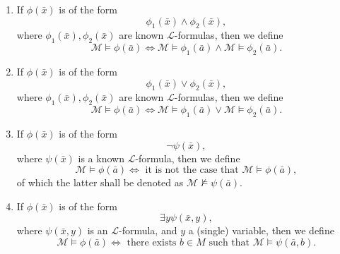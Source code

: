 \documentclass[notoc,notitlepage]{tufte-book}
\begin{document}
\begin{defn}
\begin{enumerate}
    \item If $\phi(\bar{x})$ is of the form
      \begin{equation*}
        \phi_1(\bar{x}) \land \phi_2(\bar{x}),
      \end{equation*}
      where $\phi_1(\bar{x}), \phi_2(\bar{x})$ are known $\mathcal{L}$-formulas, then we define
      \begin{equation*}
        \mathcal{M} \models \phi(\bar{a}) \iff \mathcal{M} \models \phi_1(\bar{a}) \land \mathcal{M} \models \phi_2(\bar{a}).
      \end{equation*}

    \item If $\phi(\bar{x})$ is of the form
      \begin{equation*}
        \phi_1(\bar{x}) \lor \phi_2(\bar{x}),
      \end{equation*}
      where $\phi_1(\bar{x}), \phi_2(\bar{x})$ are known $\mathcal{L}$-formulas, then we define
      \begin{equation*}
        \mathcal{M} \models \phi(\bar{a}) \iff \mathcal{M} \models \phi_1(\bar{a}) \lor \mathcal{M} \models \phi_2(\bar{a}).
      \end{equation*}

    \item If $\phi(\bar{x})$ is of the form
      \begin{equation*}
        \neg \psi(\bar{x}),
      \end{equation*}
      where $\psi(\bar{x})$ is a known $\mathcal{L}$-formula, then we define
      \begin{equation*}
        \mathcal{M} \models \phi(\bar{a}) \iff \text{ it is not the case that } \mathcal{M} \models \phi(\bar{a}),
      \end{equation*}
      of which the latter shall be denoted as $\mathcal{M} \not\models \psi(\bar{a})$.

    \item If $\phi(\bar{x})$ is of the form
      \begin{equation*}
        \exists y \psi(\bar{x}, y),
      \end{equation*}
      where $\psi(\bar{x}, y)$ is an $\mathcal{L}$-formula, and $y$ a (single) variable, then we define
      \begin{equation*}
        \mathcal{M} \models \phi(\bar{a}) \iff \text{ there exists } b \in M \text{ such that } \mathcal{M} \models \psi(\bar{a}, b).
      \end{equation*}


\end{enumerate}
\end{defn}
\end{document}
